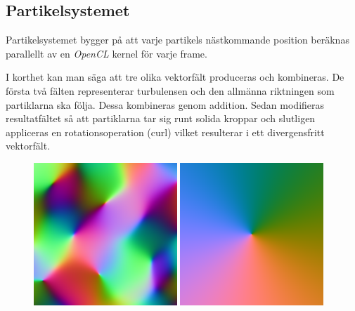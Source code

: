 \documentclass[a4paper]{article}
\begin{document}
\begin{multicols}{2}
    \vspace{-0.35cm}
    \subsection{Partikelsystemet} \label{sec:partikelsystemet}

    Partikelsystemet bygger på att varje partikels nästkommande position beräknas parallellt av en \textit{OpenCL} kernel för varje frame. 

    I korthet kan man säga att tre olika vektorfält produceras och kombineras. De första två fälten representerar turbulensen och den allmänna riktningen som partiklarna ska följa. Dessa kombineras genom addition. Sedan modifieras resultatfältet så att partiklarna tar sig runt solida kroppar och slutligen appliceras en rotationsoperation (curl) vilket resulterar i ett divergensfritt vektorfält.

\begin{figure}[H]
\begin{minipage}[]{0.5\textwidth}
\center
\includegraphics[width=0.48\textwidth]{share/Noise_downscale.png}
\includegraphics[width=0.48\textwidth]{share/Background_downscale.png}

\vspace{0.1cm}


\end{minipage}
\end{figure}
\end{multicols}
\end{document}
